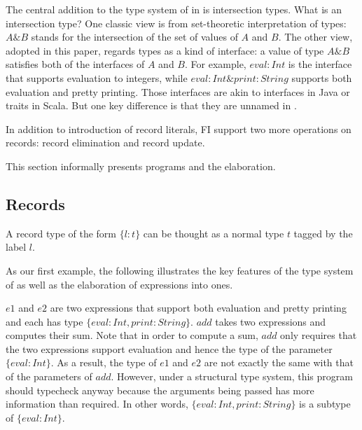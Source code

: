 

The central addition to the type system of \F in \FI is intersection types. What
is an intersection type? One classic view is from set-theoretic interpretation
of types: $ A \& B $ stands for the intersection of the set of values of $ A $
and $ B $. The other view, adopted in this paper, regards types as a kind of
interface: a value of type $ A \& B $ satisfies both of the interfaces of $ A $
and $ B $. For example, $ { eval : Int } $ is the interface that supports
evaluation to integers, while $ { eval : Int } \& { print : String } $ supports
both evaluation and pretty printing. Those interfaces are akin to interfaces in
Java or traits in Scala. But one key difference is that they are unnamed in \FIend.


In addition to introduction of record literals, FI support two more operations
on records: record elimination and record update.

This section informally presents \FI programs and the elaboration.

\subsection{Records}

A record type of the form $ \{ l : t \} $ can be thought as a normal type $ t $
tagged by the label $ l $.


As our first example, the following illustrates the key features of the type
system of \FI as well as the elaboration of \FI expressions into \F ones.


$ e1 $ and $ e2 $ are two expressions that support both evaluation and pretty
printing and each has type $ \{ eval : Int, print : String \} $. $ add $ takes
two expressions and computes their sum. Note that in order to compute a sum,
$ add $ only requires that the two expressions support evaluation and hence the
type of the parameter $ \{ eval : Int \} $. As a result, the type of $ e1 $ and
$ e2 $ are not exactly the same with that of the parameters of $ add $. However,
under a structural type system, this program should typecheck anyway because the
arguments being passed has more information than required. In other words,
$ \{ eval : Int, print : String \} $ is a subtype of $ \{ eval : Int \} $.

